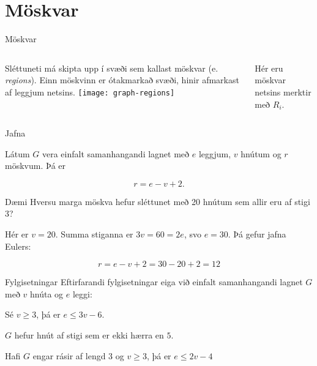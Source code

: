 \documentclass[handout]{beamer}
\begin{document}
\section{Möskvar}

\begin{frame}{Möskvar}
\begin{columns}
Sléttuneti má skipta upp í svæði sem kallast möskvar (e. \emph{regions}). Einn möskvinn er ótakmarkað svæði, hinir afmarkast af leggjum netsins.
\texttt{[image: graph-regions]}

Hér eru möskvar netsins merktir með $R_i$.
\end{columns}
\end{frame}

\begin{frame}{Jafna}
\begin{tcolorbox}[title=Jafna Eulers]
Látum $G$ vera einfalt samanhangandi lagnet með $e$ leggjum, $v$ hnútum og $r$ möskvum. Þá er

\[
 r = e - v + 2.
\]

\end{tcolorbox}
\end{frame}

\begin{frame}{Dæmi}
Hversu marga möskva hefur sléttunet með 20 hnútum sem allir eru af stigi 3?
\pause

\vspace{1cm}
Hér er $v=20$. Summa stiganna er $3v = 60 = 2e$, svo $e = 30$. Þá gefur jafna Eulers:

\[
 r = e - v + 2 = 30 - 20 + 2 = 12
\]

\end{frame}

\begin{frame}{Fylgisetningar}
Eftirfarandi fylgisetningar eiga við einfalt samanhangandi lagnet $G$ með $v$ hnúta og $e$ leggi:
\begin{tcolorbox}
Sé $v \geq 3$, þá er $e \leq 3v - 6$.
\end{tcolorbox}

\begin{tcolorbox}
$G$ hefur hnút af stigi sem er ekki hærra en $5$.
\end{tcolorbox}

\begin{tcolorbox}
Hafi $G$ engar rásir af lengd 3 og $v \geq 3$, þá er $e \leq 2v -4$
\end{tcolorbox}
\end{frame}
\end{document}
